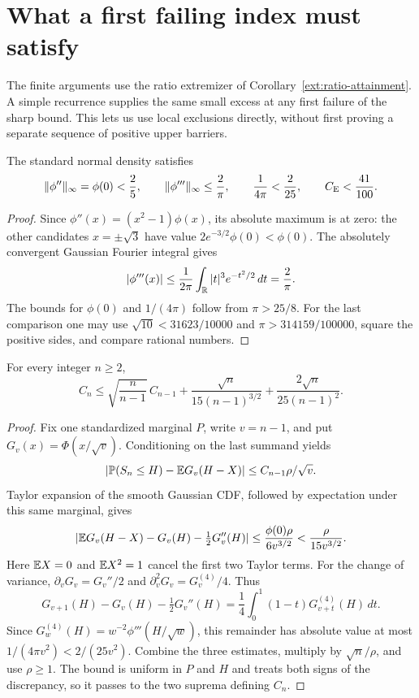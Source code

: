 \section{What a first failing index must satisfy}
\label{ext:smoothing}

The finite arguments use the ratio extremizer of
Corollary~\ref{ext:ratio-attainment}. A simple recurrence supplies the
same small excess at any first failure of the sharp bound. This lets us
use local exclusions directly, without first proving a separate sequence
of positive upper barriers.

\begin{lemma}\label{ext:gaussian-constants}
The standard normal density satisfies
\[
 \|\phi''\|_\infty=\phi(0)<\frac25,
 \qquad \|\phi'''\|_\infty\le\frac2\pi,
 \qquad \frac1{4\pi}<\frac2{25},\qquad C_{\mathrm E}<\frac{41}{100}.
\]
\end{lemma}
\begin{proof}
Since $\phi''(x)=(x^2-1)\phi(x)$, its absolute maximum is at zero:
the other candidates $x=\pm\sqrt3$ have value
$2e^{-3/2}\phi(0)<\phi(0)$. The absolutely convergent Gaussian
Fourier integral gives
\[
 |\phi'''(x)|\le\frac1{2\pi}
       \int_{\mathbb R}|t|^3e^{-t^2/2}\,dt=\frac2\pi.
\]
The bounds for $\phi(0)$ and $1/(4\pi)$ follow from $\pi>25/8$.
For the last comparison one may use
$\sqrt{10}<31623/10000$ and $\pi>314159/100000$, square the
positive sides, and compare rational numbers.
\end{proof}

\begin{theorem}\label{ext:one-step}
For every integer $n\ge2$,
\begin{equation}\label{ext:smoothing-recurrence}
 C_n\le\sqrt{\frac n{n-1}}\,C_{n-1}
       +\frac{\sqrt n}{15(n-1)^{3/2}}
       +\frac{2\sqrt n}{25(n-1)^2}.
\end{equation}
\end{theorem}
\begin{proof}
Fix one standardized marginal $P$, write $v=n-1$, and put
$G_v(x)=\Phi(x/\sqrt v)$. Conditioning on the last summand yields
\[
 |\mathbb P(S_n\le H)-\mathbb E G_v(H-X)|\le C_{n-1}\rho/\sqrt v.
\]
Taylor expansion of the smooth Gaussian CDF, followed by expectation
under this same marginal, gives
\[
 |\mathbb E G_v(H-X)-G_v(H)-\tfrac12G_v''(H)|
 \le\frac{\phi(0)\rho}{6v^{3/2}}<\frac\rho{15v^{3/2}}.
\]
Here $\mathbb E X=0$ and $\mathbb E X^2=1$ cancel the first two Taylor terms.
For the change of variance, $\partial_vG_v=G_v''/2$ and
$\partial_v^2G_v=G_v^{(4)}/4$. Thus
\[
 G_{v+1}(H)-G_v(H)-\tfrac12G_v''(H)
 =\frac14\int_0^1(1-t)G_{v+t}^{(4)}(H)\,dt.
\]
Since $G_w^{(4)}(H)=w^{-2}\phi'''(H/\sqrt w)$, this remainder
has absolute value at most $1/(4\pi v^2)<2/(25v^2)$.
Combine the three estimates, multiply by $\sqrt n/\rho$, and use
$\rho\ge1$. The bound is uniform in $P$ and $H$ and treats both
signs of the discrepancy, so it passes to the two suprema defining $C_n$.
\end{proof}

